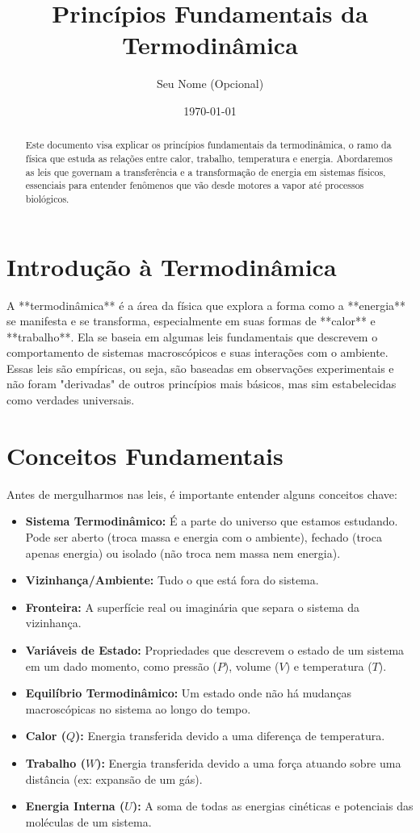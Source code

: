 \documentclass{article}
\title{Princípios Fundamentais da Termodinâmica}
\author{Seu Nome (Opcional)}
\date{\today}
\begin{document}
\maketitle

\begin{abstract}
Este documento visa explicar os princípios fundamentais da termodinâmica, o ramo da física que estuda as relações entre calor, trabalho, temperatura e energia. Abordaremos as leis que governam a transferência e a transformação de energia em sistemas físicos, essenciais para entender fenômenos que vão desde motores a vapor até processos biológicos.
\end{abstract}

\section{Introdução à Termodinâmica}

A **termodinâmica** é a área da física que explora a forma como a **energia** se manifesta e se transforma, especialmente em suas formas de **calor** e **trabalho**. Ela se baseia em algumas leis fundamentais que descrevem o comportamento de sistemas macroscópicos e suas interações com o ambiente. Essas leis são empíricas, ou seja, são baseadas em observações experimentais e não foram "derivadas" de outros princípios mais básicos, mas sim estabelecidas como verdades universais.

\section{Conceitos Fundamentais}

Antes de mergulharmos nas leis, é importante entender alguns conceitos chave:
\begin{itemize}
    \item \textbf{Sistema Termodinâmico:} É a parte do universo que estamos estudando. Pode ser aberto (troca massa e energia com o ambiente), fechado (troca apenas energia) ou isolado (não troca nem massa nem energia).
    \item \textbf{Vizinhança/Ambiente:} Tudo o que está fora do sistema.
    \item \textbf{Fronteira:} A superfície real ou imaginária que separa o sistema da vizinhança.
    \item \textbf{Variáveis de Estado:} Propriedades que descrevem o estado de um sistema em um dado momento, como pressão ($P$), volume ($V$) e temperatura ($T$).
    \item \textbf{Equilíbrio Termodinâmico:} Um estado onde não há mudanças macroscópicas no sistema ao longo do tempo.
    \item \textbf{Calor ($Q$):} Energia transferida devido a uma diferença de temperatura.
    \item \textbf{Trabalho ($W$):} Energia transferida devido a uma força atuando sobre uma distância (ex: expansão de um gás).
    \item \textbf{Energia Interna ($U$):} A soma de todas as energias cinéticas e potenciais das moléculas de um sistema.
\end{itemize}
\end{document}
